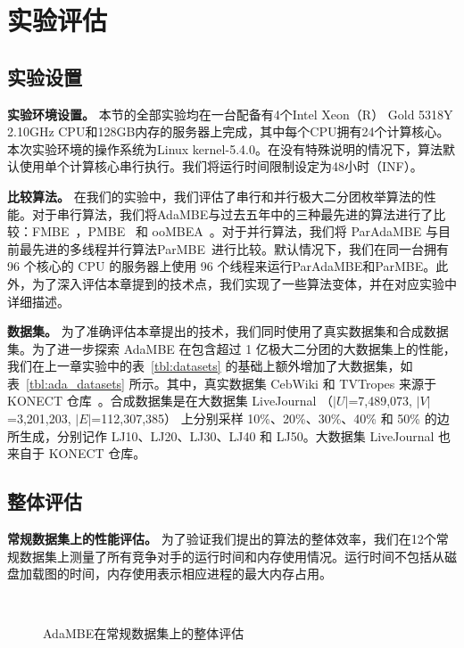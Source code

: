 \section{实验评估}

\subsection{实验设置}

\textbf{实验环境设置。} 本节的全部实验均在一台配备有4个Intel Xeon（R） Gold 5318Y 2.10GHz CPU和128GB内存的服务器上完成，其中每个CPU拥有24个计算核心。本次实验环境的操作系统为Linux kernel-5.4.0。在没有特殊说明的情况下，算法默认使用单个计算核心串行执行。我们将运行时间限制设定为48小时（INF）。

\textbf{比较算法。} 在我们的实验中，我们评估了串行和并行极大二分团枚举算法的性能。对于串行算法，我们将AdaMBE与过去五年中的三种最先进的算法进行了比较：FMBE~\cite{parMBE18}，PMBE~\cite{PMBE20} 和 ooMBEA~\cite{ooMBE22}。对于并行算法，我们将 ParAdaMBE 与目前最先进的多线程并行算法ParMBE~\cite{parMBE18}进行比较。默认情况下，我们在同一台拥有 96 个核心的 CPU 的服务器上使用 96 个线程来运行ParAdaMBE和ParMBE。此外，为了深入评估本章提到的技术点，我们实现了一些算法变体，并在对应实验中详细描述。




\textbf{数据集。} 为了准确评估本章提出的技术，我们同时使用了真实数据集和合成数据集。为了进一步探索 AdaMBE 在包含超过 1 亿极大二分团的大数据集上的性能，我们在上一章实验中的表~\ref{tbl:datasets} 的基础上额外增加了大数据集，如表~\ref{tbl:ada_datasets} 所示。其中，真实数据集 CebWiki 和 TVTropes 来源于 KONECT 仓库~\cite{konect}。合成数据集是在大数据集 LiveJournal （$|U|$=7,489,073, $|V|$=3,201,203, $|E|$=112,307,385） 上分别采样 10\%、20\%、30\%、40\% 和 50\% 的边所生成，分别记作 LJ10、LJ20、LJ30、LJ40 和 LJ50。大数据集 LiveJournal 也来自于 KONECT 仓库。

\subsection{整体评估}

\textbf{常规数据集上的性能评估。} 为了验证我们提出的算法的整体效率，我们在12个常规数据集上测量了所有竞争对手的运行时间和内存使用情况。运行时间不包括从磁盘加载图的时间，内存使用表示相应进程的最大内存占用。


\begin{figure} [H]
  \centering
	\vspace{0.1in}
	\\
  \caption{AdaMBE在常规数据集上的整体评估}
  \label{fig:ada_overall}

\end{figure}

